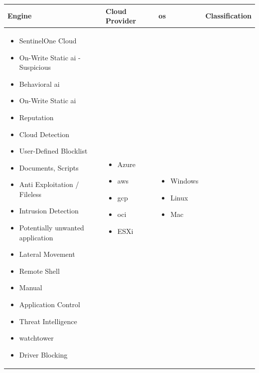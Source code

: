 \begin{longtable}{|p{4cm}|p{4cm}|p{4cm}|p{4cm}|}
      \hline
      \rowcolor{blue!20}
      Engine                                           & Cloud Provider & \acrshort{os} & Classification \\
      \endfirsthead
      \hline
      \begin{itemize}
            \item SentinelOne Cloud
            \item On-Write Static \acrshort{ai} - Suspicious
            \item Behavioral \acrshort{ai}
            \item On-Write Static \acrshort{ai}
            \item Reputation
            \item Cloud Detection
            \item User-Defined Blocklist
            \item Documents, Scripts
            \item Anti Exploitation / Fileless
            \item Intrusion Detection
            \item Potentially unwanted application
            \item Lateral Movement
            \item Remote Shell
            \item Manual
            \item Application Control
            \item Threat Intelligence
            \item \gls{watchtower}
            \item Driver Blocking
      \end{itemize} &
      \begin{itemize}
            \item Azure
            \item \acrshort{aws}
            \item \acrshort{gcp}
            \item \acrshort{oci}
            \item ESXi
      \end{itemize}                             &
      \begin{itemize}
            \item Windows
            \item Linux
            \item Mac

\end{itemize}
\end{longtable}
